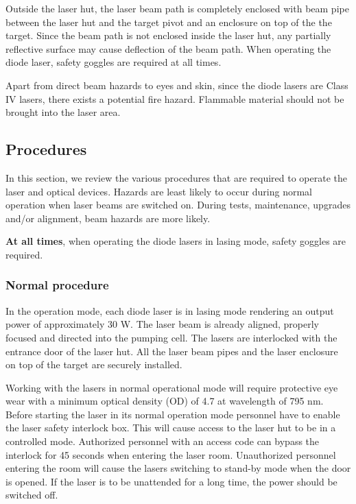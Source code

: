 {Outside the laser hut, the laser beam path is completely enclosed with beam 
pipe between the laser hut and the target pivot and an enclosure on top of the 
the target. 
Since the beam path is not enclosed inside the laser hut, any partially
reflective surface may cause deflection of the beam path. When operating the 
diode laser, safety goggles are required at all times.  

Apart from direct beam hazards to eyes and skin, since the diode lasers are 
Class IV lasers, there exists a potential fire hazard. Flammable material 
should not be brought into the laser area.  

\subsection{Procedures}

In this section, we review the various procedures that are required to operate the
laser and optical devices. Hazards are least likely to occur during normal operation
when laser beams are switched on. During tests, maintenance,
upgrades and/or alignment,  beam hazards are more likely.

{\bf At all times}, when operating the diode lasers in lasing mode, safety goggles
are required.

\subsubsection{Normal procedure}
In the operation mode, each diode laser is in lasing mode rendering an output 
power of approximately 30 W. The laser beam is already aligned, properly 
focused and directed into the pumping cell. The lasers are interlocked with the
entrance door of the laser hut. All the laser beam pipes and the laser 
enclosure on top of the target are securely installed.

Working with the lasers in normal operational mode will require protective 
eye wear with a minimum optical 
density (OD) of 4.7 at wavelength of 795 nm. Before
starting the laser in its normal operation mode personnel have to enable the
laser safety interlock box. This will cause access to the laser hut to be in 
a controlled mode. Authorized personnel with an access code can 
bypass the interlock for 45 seconds when entering the laser room. Unauthorized
personnel entering the room will cause the lasers switching to stand-by mode
when the door is opened. If the laser is to be unattended for a long time, the 
power should be switched off.

}

